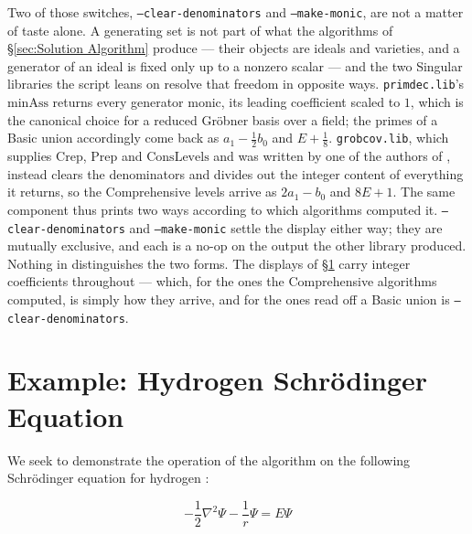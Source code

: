 \documentclass{article}
\theoremstyle{definition}
\theoremstyle{plain}
\begin{document}
Two of those switches, {\tt --clear-denominators} and
{\tt --make-monic}, are not a matter of taste alone.  A generating
set is not part of what the algorithms of \S\ref{sec:Solution Algorithm}
produce --- their objects are ideals and varieties, and a generator of an
ideal is fixed only up to a nonzero scalar --- and the two Singular libraries
the script leans on resolve that freedom in opposite ways.  {\tt primdec.lib}'s
$\mathrm{minAss}$ returns every generator monic, its leading coefficient
scaled to $1$, which is the canonical choice for a reduced Gr\"obner basis
over a field; the primes of a Basic union accordingly come back as
$a_1 - \frac{1}{2} b_0$ and $E + \frac{1}{8}$.  {\tt grobcov.lib}, which
supplies $\mathrm{Crep}$, $\mathrm{Prep}$ and $\mathrm{ConsLevels}$ and was
written by one of the authors of \cite{BrunatMontes}, instead clears the
denominators and divides out the integer content of everything it returns, so
the Comprehensive levels arrive as $2 a_1 - b_0$ and $8E + 1$.  The same
component thus prints two ways according to which algorithms computed it.
{\tt --clear-denominators} and {\tt --make-monic} settle the display either
way; they are mutually exclusive, and each is a no-op on the output the other
library produced.  Nothing in \cite{BrunatMontes} distinguishes the two forms.
The displays of \S\ref{sec:Example} carry integer coefficients throughout ---
which, for the ones the Comprehensive algorithms computed, is simply how they
arrive, and for the ones read off a Basic union is
{\tt --clear-denominators}.


\vfill\eject
\section{Example: Hydrogen Schr\"odinger Equation}
\label{sec:Example}

We seek to demonstrate the operation of the algorithm on the following Schr\"o\-dinger equation for hydrogen \cite{pauling and wilson}:

\begin{equation}
\label{schrodinger hydrogen 2}
-\frac{1}{2}\nabla^2 \Psi - \frac{1}{r}\Psi = E \Psi
\end{equation}
\end{document}
